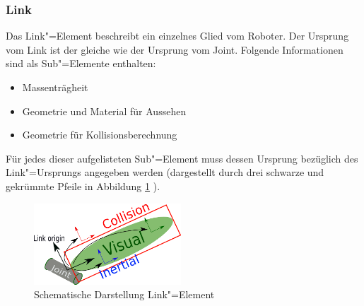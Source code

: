 \subsubsection{Link}
\label{chap:link}
Das Link"=Element beschreibt ein einzelnes Glied vom Roboter.
Der Ursprung vom Link ist der gleiche wie der Ursprung vom Joint.
Folgende Informationen sind als Sub"=Elemente enthalten: 
\begin{itemize}
\item Massenträgheit
\item Geometrie und Material für Aussehen
\item Geometrie für Kollisionsberechnung
\end{itemize}
Für jedes dieser aufgelisteten Sub"=Element muss dessen Ursprung bezüglich des Link"=Ursprungs angegeben werden (dargestellt durch drei schwarze und gekrümmte Pfeile in Abbildung \ref{Ab:aufbaut-link} ).
\begin{figure}[ht!]
	\centering
	\includegraphics[width=5.5cm]{images/urdf_link.png}
	\caption{Schematische Darstellung Link"=Element \cite{ros}}
	\label{Ab:aufbaut-link}
\end{figure}

